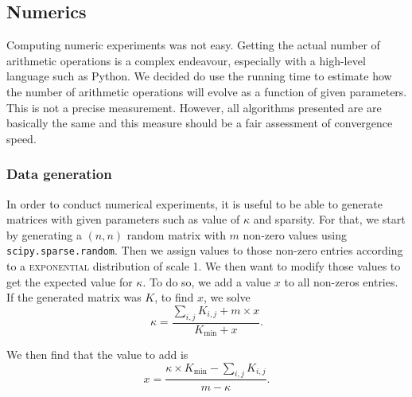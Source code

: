
\subsection{Numerics}

Computing numeric experiments was not easy. Getting the actual number of arithmetic operations is a complex endeavour, especially with a high-level language such as Python. We decided do use the running time to estimate how the number of arithmetic operations will evolve as a function of given parameters. This is not a precise measurement. However, all algorithms presented are are basically the same and this measure should be a fair assessment of convergence speed. 


\subsubsection{Data generation}\label{data_genaration}

In order to conduct numerical experiments, it is useful to be able to generate matrices with given parameters such as value of \(\kappa\) and sparsity. For that, we start by generating a \((n,n)\) random matrix with \(m\) non-zero values using \texttt{scipy.sparse.random}. Then we assign values to those non-zero entries according to a \textsc{exponential} distribution of scale 1. We then want to modify those values to get the expected value for \(\kappa\). To do so, we add a value \(x\) to all non-zeros entries. If the generated matrix was \(K\), to find \(x\), we solve 
\[
    \kappa = \dfrac{\sum_{i,j} K_{i,j} + m \times x}{K_{\text{min}} + x}.
\]        

We then find that the value to add is 
\[
    x = \dfrac{\kappa \times K_\text{min} - \sum_{i,j}K_{i,j}}{m - \kappa}.   
\]

